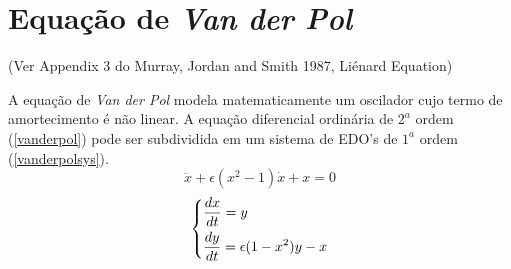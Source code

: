 \section{\textbf{Equação de \textit{Van der Pol}}}
\textcolor{red!}{(Ver Appendix 3 do Murray, Jordan and Smith 1987, Liénard Equation)}\par
A equação de \textit{Van der Pol} modela matematicamente um oscilador cujo termo de amortecimento é não linear. A equação diferencial ordinária de $2^{a}$ ordem (\ref{vanderpol}) pode ser subdividida em um sistema de EDO's de $1^{a}$ ordem (\ref{vanderpolsys}).
\begin{equation}
\ddot{x}+\epsilon (x^{2}-1)\dot{x}+x=0
\label{vanderpol}
\end{equation}
\begin{equation}
\centering
    \begin{dcases}
      \frac{dx}{dt}=y\\
      \frac{dy}{dt}=\epsilon (1-x^{2})y-x\\
    \end{dcases}
\label{vanderpolsys}
\end{equation}



